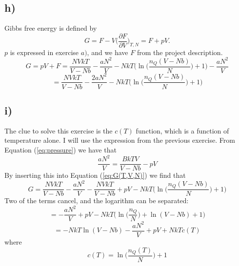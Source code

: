 \documentclass{scrartcl}
\begin{document}
\subsection*{h)}
Gibbs free energy is defined by
\begin{equation*}
G=F-V\bigg(\frac{\partial F}{\partial V}\bigg)_{T,N}=F+pV.
\end{equation*}
$p$ is expressed in exercise $a)$, and we have $F$ from the project description. 
\begin{equation*}
G=pV+F=\frac{NVkT}{V-Nb}-\frac{aN^2}{V}-NkT\Bigg(\ln\bigg(\frac{n_Q(V-Nb)}{N}\bigg)+1\Bigg)-\frac{aN^2}{V}
\end{equation*}
\begin{equation}
=\frac{NVkT}{V-Nb}-\frac{2aN^2}{V}-NkT\Bigg(\ln\bigg(\frac{n_Q(V-Nb)}{N}\bigg)+1\Bigg)
\label{eq:G(T,V,N)}
\end{equation}

\subsection*{i)}
The clue to solve this exercise is the $c(T)$ function, which is a function of temperature alone. I will use the expression from the previous exercise. From Equation (\ref{eq:pressure}) we have that
\begin{equation*}
\frac{aN^2}{V}=\frac{BkTV}{V-Nb}-pV
\end{equation*}
By inserting this into Equation (\ref{eq:G(T,V,N)}) we find that
\begin{equation*}
G=\frac{NVkT}{V-Nb}-\frac{aN^2}{V}-\frac{NVkT}{V-Nb}+pV-NkT\Bigg(\ln\bigg(\frac{n_Q(V-Nb)}{N}\bigg)+1\Bigg)
\end{equation*}
Two of the terms cancel, and the logarithm can be separated:
\begin{equation*}
=-\frac{aN^2}{V}+pV-NkT\Bigg(\ln\bigg(\frac{n_Q}{N}\bigg)+\ln(V-Nb)+1\Bigg)
\end{equation*}
\begin{equation}
=-NkT\ln(V-Nb)-\frac{aN^2}{V}+pV+NkTc(T)
\end{equation}
where 
\begin{equation*}
c(T)=\ln\bigg(\frac{n_Q(T)}{N}\bigg)+1
\end{equation*}
\end{document}
